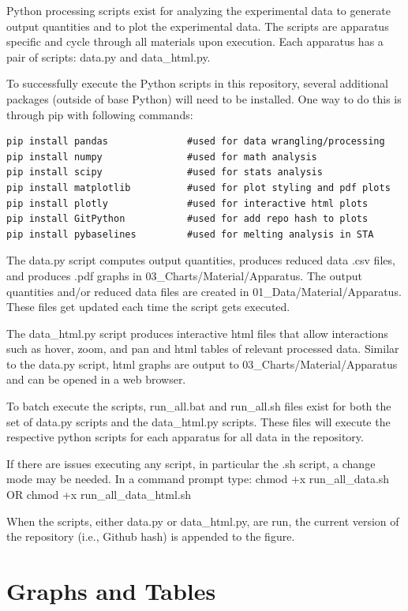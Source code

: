 \documentclass[12pt,oneside]{book}
\begin{document}
Python processing scripts exist for analyzing the experimental data to generate output quantities and to plot the experimental data. The scripts are apparatus specific and cycle through all materials upon execution. Each apparatus has a pair of scripts: data.py and data\_html.py.

To successfully execute the Python scripts in this repository, several additional packages (outside of base Python) will need to be installed. One way to do this is through pip with following commands:

\begin{verbatim}
pip install pandas              #used for data wrangling/processing
pip install numpy               #used for math analysis
pip install scipy               #used for stats analysis
pip install matplotlib          #used for plot styling and pdf plots
pip install plotly              #used for interactive html plots
pip install GitPython           #used for add repo hash to plots
pip install pybaselines         #used for melting analysis in STA
\end{verbatim}

The data.py script computes output quantities, produces reduced data .csv files, and produces .pdf graphs in 03\_Charts/Material/Apparatus. The output quantities and/or reduced data files are created in 01\_Data/Material/Apparatus. These files get updated each time the script gets executed.

The data\_html.py script produces interactive html files that allow interactions such as hover, zoom, and pan and html tables of relevant processed data. Similar to the data.py script, html graphs are output to 03\_Charts/Material/Apparatus and can be opened in a web browser.

To batch execute the scripts, run\_all.bat and run\_all.sh files exist for both the set of data.py scripts and the data\_html.py scripts. These files will execute the respective python scripts for each apparatus for all data in the repository.

If there are issues executing any script, in particular the .sh script, a change mode may be needed. In a command prompt type: chmod +x run\_all\_data.sh OR chmod +x run\_all\_data\_html.sh

When the scripts, either data.py or data\_html.py, are run, the current version of the repository (i.e., Github hash) is appended to the figure.

\section{Graphs and Tables}
\label{sec:graphs}
\end{document}
